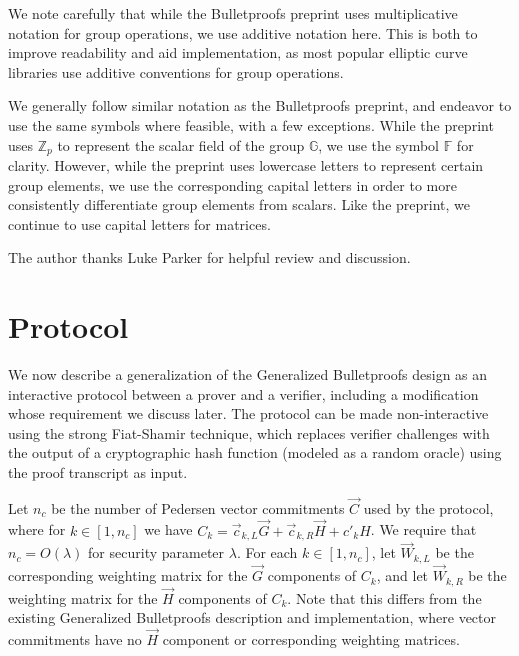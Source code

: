 \documentclass{article}
\newcommand{\GG}{\mathbb{G}}
\newcommand{\FF}{\mathbb{F}}
\newcommand{\mat}[1]{\vec{#1}}
\begin{document}
We note carefully that while the Bulletproofs preprint uses multiplicative notation for group operations, we use additive notation here.
This is both to improve readability and aid implementation, as most popular elliptic curve libraries use additive conventions for group operations.

We generally follow similar notation as the Bulletproofs preprint, and endeavor to use the same symbols where feasible, with a few exceptions.
While the preprint uses $\mathbb{Z}_p$ to represent the scalar field of the group $\GG$, we use the symbol $\FF$ for clarity.
However, while the preprint uses lowercase letters to represent certain group elements, we use the corresponding capital letters in order to more consistently differentiate group elements from scalars.
Like the preprint, we continue to use capital letters for matrices.

The author thanks Luke Parker for helpful review and discussion.


\section{Protocol}

We now describe a generalization of the Generalized Bulletproofs design as an interactive protocol between a prover and a verifier, including a modification whose requirement we discuss later.
The protocol can be made non-interactive using the strong Fiat-Shamir technique, which replaces verifier challenges with the output of a cryptographic hash function (modeled as a random oracle) using the proof transcript as input.

Let $n_c$ be the number of Pedersen vector commitments $\vec{C}$ used by the protocol, where for $k \in [1, n_c]$ we have $C_k = \vec{c}_{k,L} \vec{G} + \vec{c}_{k,R} \vec{H} + c'_k H$.
We require that $n_c = O(\lambda)$ for security parameter $\lambda$.
For each $k \in [1, n_c]$, let $\mat{W}_{k,L}$ be the corresponding weighting matrix for the $\vec{G}$ components of $C_k$, and let $\mat{W}_{k,R}$ be the weighting matrix for the $\vec{H}$ components of $C_k$.
Note that this differs from the existing Generalized Bulletproofs description and implementation, where vector commitments have no $\vec{H}$ component or corresponding weighting matrices.
\end{document}
